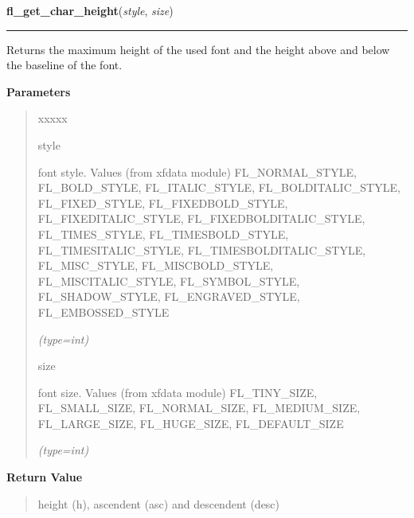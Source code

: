     \vspace{0.5ex}

\hspace{.8\funcindent}\begin{boxedminipage}{\funcwidth}

    \raggedright \textbf{fl\_get\_char\_height}(\textit{style}, \textit{size})

    \vspace{-1.5ex}

    \rule{\textwidth}{0.5\fboxrule}
\setlength{\parskip}{2ex}
    Returns the maximum height of the used font and the height above and 
    below the baseline of the font.

\setlength{\parskip}{1ex}
      \textbf{Parameters}
      \vspace{-1ex}

      \begin{quote}
        \begin{Ventry}{xxxxx}

          \item[style]

          font style. Values (from xfdata module) FL\_NORMAL\_STYLE, 
          FL\_BOLD\_STYLE, FL\_ITALIC\_STYLE, FL\_BOLDITALIC\_STYLE, 
          FL\_FIXED\_STYLE, FL\_FIXEDBOLD\_STYLE, FL\_FIXEDITALIC\_STYLE, 
          FL\_FIXEDBOLDITALIC\_STYLE, FL\_TIMES\_STYLE, 
          FL\_TIMESBOLD\_STYLE, FL\_TIMESITALIC\_STYLE, 
          FL\_TIMESBOLDITALIC\_STYLE, FL\_MISC\_STYLE, FL\_MISCBOLD\_STYLE,
          FL\_MISCITALIC\_STYLE, FL\_SYMBOL\_STYLE, FL\_SHADOW\_STYLE, 
          FL\_ENGRAVED\_STYLE, FL\_EMBOSSED\_STYLE

            {\it (type=int)}

          \item[size]

          font size. Values (from xfdata module) FL\_TINY\_SIZE, 
          FL\_SMALL\_SIZE, FL\_NORMAL\_SIZE, FL\_MEDIUM\_SIZE, 
          FL\_LARGE\_SIZE, FL\_HUGE\_SIZE, FL\_DEFAULT\_SIZE

            {\it (type=int)}

        \end{Ventry}

      \end{quote}

      \textbf{Return Value}
    \vspace{-1ex}

      \begin{quote}
      height (h), ascendent (asc) and descendent (desc)


\end{quote}
\end{boxedminipage}

